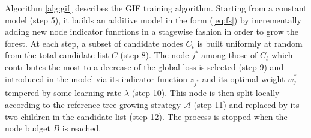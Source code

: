 \documentclass{article}
\begin{document}
Algorithm \ref{alg:gif} describes the GIF training algorithm.  Starting from a
constant model (step 5), it builds an additive model in the form (\ref{eq:fs})
by incrementally adding new node indicator functions in a stagewise fashion in
order to grow the forest.  At each step, a subset of candidate nodes $C_t$ is
built uniformly at random from the total candidate list $C$ (step 8). The node
$j^*$ among those of $C_t$ which contributes the most to a decrease of the
global loss is selected (step 9) and introduced in the model via its indicator
function $z_{j^*}$ and its optimal weight $w^*_j$ tempered by some learning rate
$\lambda$ (step 10). This node is then split locally according to the reference
tree growing strategy $\mathcal{A}$ (step 11) and replaced by its two children
in the candidate list (step 12). The process is stopped when the node budget $B$
is reached.
\end{document}
